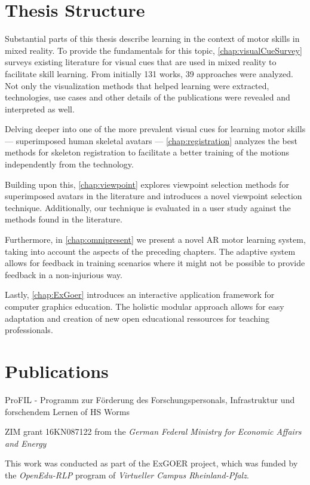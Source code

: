 \section{Thesis Structure \label{sec:intro:structure}}
Substantial parts of this thesis describe learning in the context of motor skills in mixed reality. To provide the fundamentals for this topic, \autoref{chap:visualCueSurvey} surveys existing literature for visual cues that are used in mixed reality to facilitate skill learning. From initially 131 works, 39 approaches were analyzed. Not only the visualization methods that helped learning were extracted, technologies, use cases and other details of the publications were revealed and interpreted as well.

Delving deeper into one of the more prevalent visual cues for learning motor skills --- superimposed human skeletal avatars --- \autoref{chap:registration} analyzes the best methods for skeleton registration to facilitate a better training of the motions independently from the technology.

Building upon this, \autoref{chap:viewpoint} explores viewpoint selection methods for superimposed avatars in the literature and introduces a novel viewpoint selection technique. Additionally, our technique is evaluated in a user study against the methods found in the literature.

Furthermore, in \autoref{chap:omnipresent} we present a novel AR motor learning system, taking into account the aspects of the preceding chapters. The adaptive system allows for feedback in training scenarios where it might not be possible to provide feedback in a non-injurious way. 

Lastly, \autoref{chap:ExGoer} introduces an interactive application framework for computer graphics education. The holistic modular approach allows for easy adaptation and creation of new open educational ressources for teaching professionals.

\section{Publications}
ProFIL - Programm zur Förderung des Forschungspersonals,
Infrastruktur und forschendem Lernen of HS Worms

ZIM grant 16KN087122 from the \emph{German Federal Ministry for Economic Affairs and Energy}

This work was conducted as part of the ExGOER project, which was funded by the \emph{OpenEdu-RLP} program of \emph{Virtueller Campus Rheinland-Pfalz}.



